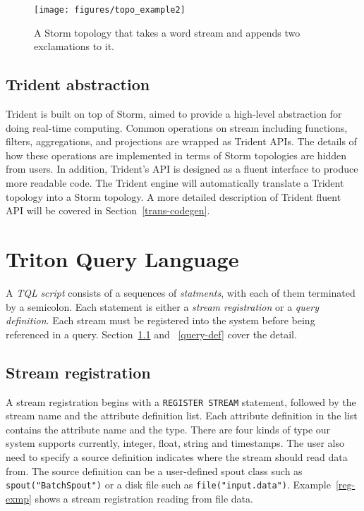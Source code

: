 \documentclass[conference, twocolumn, 11pt]{IEEEtran}
\theoremstyle{definition}
\begin{document}
\begin{figure}[hbt]
\centering
\texttt{[image: figures/topo\_example2]}
\caption{A Storm topology that takes a word stream and appends two exclamations to it.}
\label{topo-crt-exmp}
\end{figure}

\subsection{Trident abstraction}
Trident is built on top of Storm, aimed to provide a high-level abstraction for doing real-time computing. Common operations on stream including functions, filters, aggregations, and projections are wrapped as Trident APIs. The details of how these operations are implemented in terms of Storm topologies are hidden from users. In addition, Trident's API is designed as a fluent interface to produce more readable code. The Trident engine will automatically translate a Trident topology into a Storm topology. A more detailed description of Trident fluent API will be covered in Section~\ref{trans-codegen}.


\section{Triton Query Language}\label{tql}
A \emph{TQL} \emph{script} consists of a sequences of \emph{statments}, with each of them terminated by a semicolon. Each statement is either a \emph{stream registration} or a \emph{query definition}. Each stream must be registered into the system before being referenced in a query. Section~\ref{stream-reg} and ~\ref{query-def} cover the detail.\

\subsection{Stream registration}\label{stream-reg}
A stream registration begins with a \texttt{REGISTER STREAM} statement, followed by the stream name and the attribute definition list. Each attribute definition in the list contains the attribute name and the type. There are four kinds of type our system supports currently, integer, float, string and timestamps. The user also need to specify a source definition indicates where the stream should read data from. The source definition can be a user-defined spout class such as \texttt{spout("BatchSpout")} or a disk file such as \texttt{file("input.data")}. Example~\ref{reg-exmp} shows a stream registration reading from file data.
\end{document}
